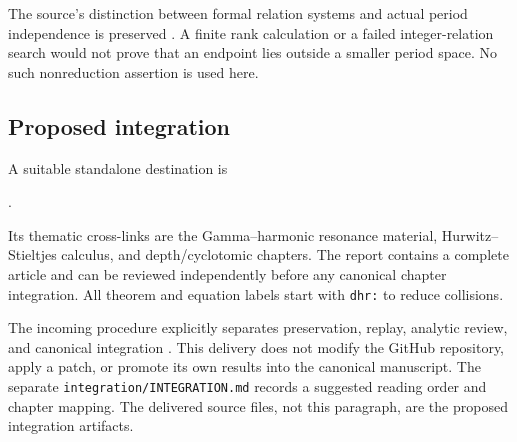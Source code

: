 The source's distinction between formal relation systems and actual
period independence is preserved \cite{repo:quotients}. A finite
rank calculation or a failed integer-relation search would not prove
that an endpoint lies outside a smaller period space. No such
nonreduction assertion is used here.

\subsection{Proposed integration}
A suitable standalone destination is
\begin{center}
\small{}.
\end{center}
Its thematic cross-links are the Gamma--harmonic resonance material,
Hurwitz--Stieltjes calculus, and depth/cyclotomic chapters. The report
contains a complete article and can be reviewed independently before
any canonical chapter integration. All theorem and equation labels
start with \texttt{dhr:} to reduce collisions.

The incoming procedure explicitly separates preservation, replay,
analytic review, and canonical integration \cite{repo:intake}. This
delivery does not modify the GitHub repository, apply a patch, or
promote its own results into the canonical manuscript. The separate
\texttt{integration/INTEGRATION.md} records a suggested reading order
and chapter mapping. The delivered source files, not this paragraph,
are the proposed integration artifacts.
